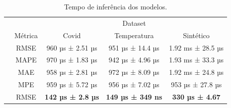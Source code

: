\begin{table}[!htp]
    \caption{Tempo de inferência dos modelos.}
    \setlength\extrarowheight{5pt}
    \begin{tabular}{|c|c|ccc|}
        \hline
        \rowcolor[HTML]{C0C0C0}
        \cellcolor[HTML]{C0C0C0}                          & \cellcolor[HTML]{C0C0C0}                          & \multicolumn{3}{c|}{\cellcolor[HTML]{C0C0C0}Dataset}                                                                                                                         \\ \cline{3-5}
        \rowcolor[HTML]{C0C0C0}
        \multirow{-2}{*}{\cellcolor[HTML]{C0C0C0}Modelo}  & \multirow{-2}{*}{\cellcolor[HTML]{C0C0C0}Métrica} & \multicolumn{1}{c|}{\cellcolor[HTML]{C0C0C0}Covid}                      & \multicolumn{1}{c|}{\cellcolor[HTML]{C0C0C0}Temperatura}               & Sintético                 \\ \hline
        \cellcolor[HTML]{C0C0C0}                          & RMSE                                              & \multicolumn{1}{c|}{960 µs ± 2.51 µs}                                   & \multicolumn{1}{c|}{951 µs ± 14.4 µs}                                  & 1.92 ms ± 28.5 µs         \\ \cline{2-5}
        \rowcolor[HTML]{EFEFEF}
        \cellcolor[HTML]{C0C0C0}                          & MAPE                                              & \multicolumn{1}{c|}{\cellcolor[HTML]{EFEFEF}970 µs ± 1.83 µs}           & \multicolumn{1}{c|}{\cellcolor[HTML]{EFEFEF}942 µs ± 4.96 µs}          & 1.93 ms ± 33.3 µs         \\ \cline{2-5}
        \cellcolor[HTML]{C0C0C0}                          & MAE                                               & \multicolumn{1}{c|}{958 µs ± 2.81 µs}                                   & \multicolumn{1}{c|}{972 µs ± 8.09 µs}                                  & 1.92 ms ± 24.8 µs         \\ \cline{2-5}
        \rowcolor[HTML]{EFEFEF}
        \multirow{-4}{*}{\cellcolor[HTML]{C0C0C0}ARIMA}   & MPE                                               & \multicolumn{1}{c|}{\cellcolor[HTML]{EFEFEF}959 µs ± 5.72 µs}           & \multicolumn{1}{c|}{\cellcolor[HTML]{EFEFEF}956 µs ± 7.02 µs}          & 953 µs ± 27.8 µs          \\ \hline
        \cellcolor[HTML]{C0C0C0}                          & RMSE                                              & \multicolumn{1}{c|}{\textbf{142 µs ± 2.8 µs}}                           & \multicolumn{1}{c|}{\textbf{149 µs ± 349 ns}}                          & \textbf{330 µs ± 4.67}    \\ \cline{2-5}

\end{tabular}
\end{table}
